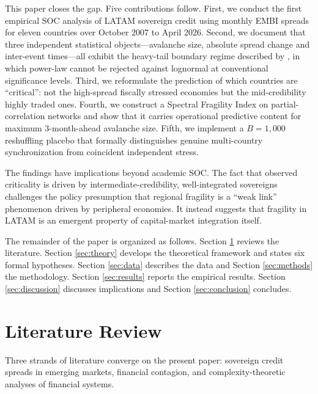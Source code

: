 \documentclass[12pt,a4paper]{article}
\begin{document}
This paper closes the gap. Five contributions follow. First, we conduct the
first empirical SOC analysis of LATAM sovereign credit using monthly EMBI
spreads for eleven countries over October 2007 to April 2026. Second, we
document that three independent statistical objects---avalanche size,
absolute spread change and inter-event times---all exhibit the heavy-tail
boundary regime described by \citet{StumpfPorter2012}, in which power-law
cannot be rejected against lognormal at conventional significance levels.
Third, we reformulate the prediction of which countries are ``critical'':
not the high-spread fiscally stressed economies but the mid-credibility
highly traded ones. Fourth, we construct a Spectral Fragility Index on
partial-correlation networks and show that it carries operational
predictive content for maximum 3-month-ahead avalanche size. Fifth, we
implement a $B=1{,}000$ reshuffling placebo that formally distinguishes
genuine multi-country synchronization from coincident independent stress.

The findings have implications beyond academic SOC. The fact that observed
criticality is driven by intermediate-credibility, well-integrated sovereigns
challenges the policy presumption that regional fragility is a ``weak link''
phenomenon driven by peripheral economies. It instead suggests that fragility
in LATAM is an emergent property of capital-market integration itself.

The remainder of the paper is organized as follows. Section
\ref{sec:literature} reviews the literature. Section \ref{sec:theory}
develops the theoretical framework and states six formal hypotheses. Section
\ref{sec:data} describes the data and Section \ref{sec:methods} the
methodology. Section \ref{sec:results} reports the empirical results.
Section \ref{sec:discussion} discusses implications and Section
\ref{sec:conclusion} concludes.

\section{Literature Review}
\label{sec:literature}

Three strands of literature converge on the present paper: sovereign credit
spreads in emerging markets, financial contagion, and complexity-theoretic
analyses of financial systems.
\end{document}
